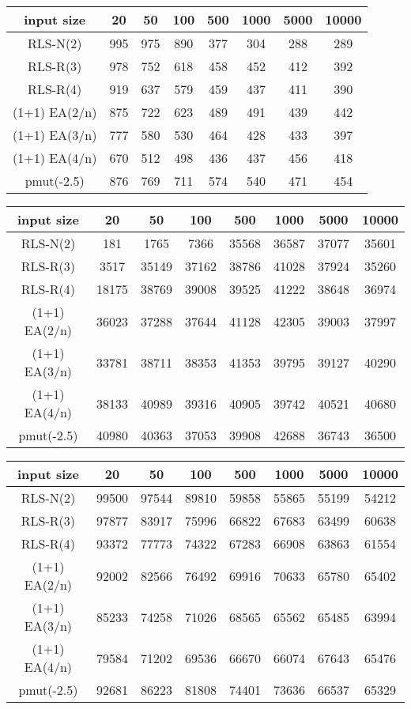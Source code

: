 \begin{tabular}{cccccccc}
      input size    & 20  & 50  & 100 & 500 & 1000 & 5000 & 10000 \\\hline
      RLS-N(2)      & 995 & 975 & 890 & 377 & 304  & 288  & 289   \\
      RLS-R(3)      & 978 & 752 & 618 & 458 & 452  & 412  & 392   \\
      RLS-R(4)      & 919 & 637 & 579 & 459 & 437  & 411  & 390   \\
      (1+1) EA(2/n) & 875 & 722 & 623 & 489 & 491  & 439  & 442   \\
      (1+1) EA(3/n) & 777 & 580 & 530 & 464 & 428  & 433  & 397   \\
      (1+1) EA(4/n) & 670 & 512 & 498 & 436 & 437  & 456  & 418   \\
      pmut(-2.5)    & 876 & 769 & 711 & 574 & 540  & 471  & 454   \\
\end{tabular}

\begin{tabular}{cccccccc}
      input size    & 20    & 50    & 100   & 500   & 1000  & 5000  & 10000 \\\hline
      RLS-N(2)      & 181   & 1765  & 7366  & 35568 & 36587 & 37077 & 35601 \\
      RLS-R(3)      & 3517  & 35149 & 37162 & 38786 & 41028 & 37924 & 35260 \\
      RLS-R(4)      & 18175 & 38769 & 39008 & 39525 & 41222 & 38648 & 36974 \\
      (1+1) EA(2/n) & 36023 & 37288 & 37644 & 41128 & 42305 & 39003 & 37997 \\
      (1+1) EA(3/n) & 33781 & 38711 & 38353 & 41353 & 39795 & 39127 & 40290 \\
      (1+1) EA(4/n) & 38133 & 40989 & 39316 & 40905 & 39742 & 40521 & 40680 \\
      pmut(-2.5)    & 40980 & 40363 & 37053 & 39908 & 42688 & 36743 & 36500 \\
\end{tabular}

\begin{tabular}{cccccccc}
      input size    & 20    & 50    & 100   & 500   & 1000  & 5000  & 10000 \\\hline
      RLS-N(2)      & 99500 & 97544 & 89810 & 59858 & 55865 & 55199 & 54212 \\
      RLS-R(3)      & 97877 & 83917 & 75996 & 66822 & 67683 & 63499 & 60638 \\
      RLS-R(4)      & 93372 & 77773 & 74322 & 67283 & 66908 & 63863 & 61554 \\
      (1+1) EA(2/n) & 92002 & 82566 & 76492 & 69916 & 70633 & 65780 & 65402 \\
      (1+1) EA(3/n) & 85233 & 74258 & 71026 & 68565 & 65562 & 65485 & 63994 \\
      (1+1) EA(4/n) & 79584 & 71202 & 69536 & 66670 & 66074 & 67643 & 65476 \\
      pmut(-2.5)    & 92681 & 86223 & 81808 & 74401 & 73636 & 66537 & 65329
\end{tabular}





